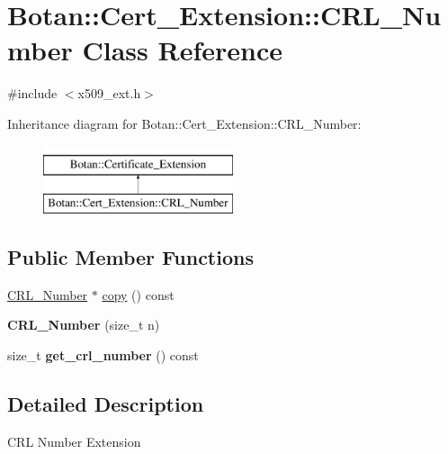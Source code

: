 \hypertarget{classBotan_1_1Cert__Extension_1_1CRL__Number}{\section{Botan\-:\-:Cert\-\_\-\-Extension\-:\-:C\-R\-L\-\_\-\-Number Class Reference}
\label{classBotan_1_1Cert__Extension_1_1CRL__Number}
}


{\ttfamily \#include $<$x509\-\_\-ext.\-h$>$}

Inheritance diagram for Botan\-:\-:Cert\-\_\-\-Extension\-:\-:C\-R\-L\-\_\-\-Number\-:\begin{figure}[H]
\begin{center}
\leavevmode
\includegraphics[height=2.000000cm]{classBotan_1_1Cert__Extension_1_1CRL__Number}
\end{center}
\end{figure}
\subsection*{Public Member Functions}
\begin{DoxyCompactItemize}
\item 
\hyperlink{classBotan_1_1Cert__Extension_1_1CRL__Number}{C\-R\-L\-\_\-\-Number} $\ast$ \hyperlink{classBotan_1_1Cert__Extension_1_1CRL__Number_ac42fc1f5df638b81584fd86435cf8049}{copy} () const 
\item 
\hypertarget{classBotan_1_1Cert__Extension_1_1CRL__Number_a9a50280fd4a0d89253c5f129cc734685}{{\bfseries C\-R\-L\-\_\-\-Number} (size\-\_\-t n)}\label{classBotan_1_1Cert__Extension_1_1CRL__Number_a9a50280fd4a0d89253c5f129cc734685}

\item 
\hypertarget{classBotan_1_1Cert__Extension_1_1CRL__Number_ab5c715f03780f20b71158c40d0ad357f}{size\-\_\-t {\bfseries get\-\_\-crl\-\_\-number} () const }\label{classBotan_1_1Cert__Extension_1_1CRL__Number_ab5c715f03780f20b71158c40d0ad357f}

\end{DoxyCompactItemize}


\subsection{Detailed Description}
C\-R\-L Number Extension 

